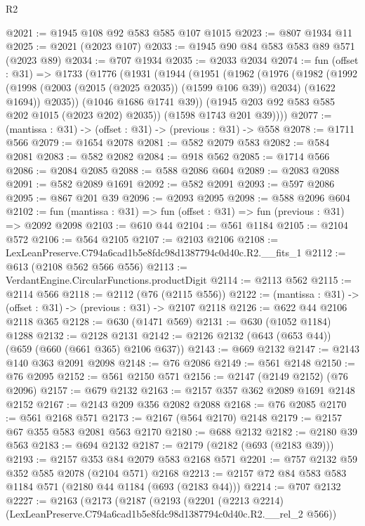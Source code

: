 \begin{lexlean}{R2}
\begin{coremodule}
@2021 := @1945 @108 @92 @583 @585 @107 @1015
@2023 := @807 @1934 @11
@2025 := @2021 (@2023 @107)
@2033 := @1945 @90 @84 @583 @583 @89 @571 (@2023 @89)
@2034 := @707 @1934
@2035 := @2033 @2034
@2074 := fun (offset : @31) =>
  @1733
    (@1776
      (@1931
        (@1944
          (@1951
            (@1962
              (@1976
                (@1982
                  (@1992 (@1998 (@2003 (@2015 (@2025 @2035)) (@1599 @106 @39)) @2034) (@1622 @1694))
                  @2035))
              (@1046 @1686 @1741 @39))
            (@1945 @203 @92 @583 @585 @202 @1015 (@2023 @202) @2035))
          (@1598 @1743 @201 @39))))
@2077 := (mantissa : @31) -> (offset : @31) -> (previous : @31) -> @558
@2078 := @1711 @566
@2079 := @1654 @2078
@2081 := @582 @2079 @583
@2082 := @584 @2081
@2083 := @582 @2082
@2084 := @918 @562
@2085 := @1714 @566
@2086 := @2084 @2085
@2088 := @588 @2086 @604
@2089 := @2083 @2088
@2091 := @582 @2089 @1691
@2092 := @582 @2091
@2093 := @597 @2086
@2095 := @867 @201 @39
@2096 := @2093 @2095
@2098 := @588 @2096 @604
@2102 := fun (mantissa : @31) => fun (offset : @31) => fun (previous : @31) => @2092 @2098
@2103 := @610 @44
@2104 := @561 @1184
@2105 := @2104 @572
@2106 := @564 @2105
@2107 := @2103 @2106
@2108 := LexLeanPreserve.C794a6cad1b5e8fdc98d1387794c0d40c.R2.__fits_1
@2112 := @613 (@2108 @562 @566 @556)
@2113 := VerdantEngine.CircularFunctions.productDigit
@2114 := @2113 @562
@2115 := @2114 @566
@2118 := @2112 (@76 (@2115 @556))
@2122 := (mantissa : @31) -> (offset : @31) -> (previous : @31) -> @2107 @2118
@2126 := @622 @44 @2106 @2118 @365
@2128 := @630 (@1471 @569)
@2131 := @630 (@1052 @1184) @1288
@2132 := @2128 @2131
@2142 := @2126 @2132 (@643 (@653 @44)) (@659 (@660 (@661 @365) @2106 @637))
@2143 := @669 @2132
@2147 := @2143 @140 @363 @2091 @2098
@2148 := @76 @2086
@2149 := @561 @2148
@2150 := @76 @2095
@2152 := @561 @2150 @571
@2156 := @2147 (@2149 @2152) (@76 @2096)
@2157 := @679 @2132
@2163 := @2157 @357 @362 @2089 @1691 @2148 @2152
@2167 := @2143 @209 @356 @2082 @2088
@2168 := @76 @2085
@2170 := @561 @2168 @571
@2173 := @2167 (@564 @2170) @2148
@2179 := @2157 @67 @355 @583 @2081 @563 @2170
@2180 := @688 @2132
@2182 := @2180 @39 @563
@2183 := @694 @2132
@2187 := @2179 (@2182 (@693 (@2183 @39)))
@2193 := @2157 @353 @84 @2079 @583 @2168 @571
@2201 := @757 @2132 @59 @352 @585 @2078 (@2104 @571) @2168
@2213 := @2157 @72 @84 @583 @583 @1184 @571 (@2180 @44 @1184 (@693 (@2183 @44)))
@2214 := @707 @2132
@2227 := @2163
    (@2173
      (@2187
        (@2193
          (@2201 (@2213 @2214) (LexLeanPreserve.C794a6cad1b5e8fdc98d1387794c0d40c.R2.__rel_2 @566))

\end{coremodule}
\end{lexlean}
